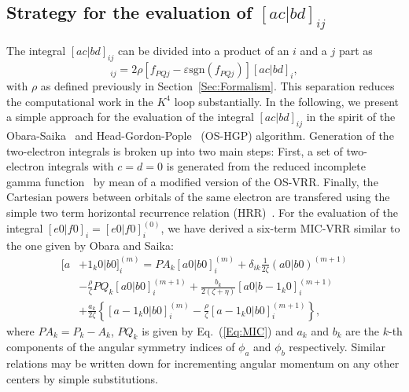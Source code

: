 \documentclass[prl,preprint,doublespace]{revtex4} %
\begin{document}
\subsection{Strategy for the evaluation of $[ac|bd]_{ij}$}
The integral $[ac|bd]_{ij}$ can be divided into a product of an $i$ and a $j$ part as
\begin{equation*}
 [ac|bd]_{ij}=2\rho[f_{PQj}-\varepsilon\mathrm{sgn}(f_{PQj}) ][ac|bd]_{i},
\end{equation*}
with $\rho$ as defined previously in Section~\ref{Sec:Formalism}. 
This separation reduces the computational work
in the $K^4$ loop substantially.
In the following, we present a simple approach for the evaluation of
the integral $[ac|bd]_{ij}$ in the spirit of the Obara-Saika~\cite{SObara86}
and Head-Gordon-Pople~\cite{MGordon88} (OS-HGP) algorithm.
Generation of the two-electron integrals is broken up into two
main steps: First, a set of two-electron integrals with $c=d=0$ is generated from the
reduced incomplete gamma function~\cite{IShavitt63} 
by mean of a modified version of the OS-VRR. Finally,
the Cartesian powers between orbitals of the same electron are transfered using 
the simple two term horizontal recurrence relation (HRR)~\cite{MGordon88}.
For the evaluation of the integral $[e0|f0]_{i}=[e0|f0]_{i}^{(0)}$, we have 
derived a six-term MIC-VRR similar
to the one given by Obara and Saika:
\begin{equation}\label{Eq:MIC-VRR}
  \begin{split}
    [a&+1_k0|b0]_{i}^{(m)}=
    PA_k[a0|b0]_{i}^{(m)}
    +\delta_{ik}\frac{1}{2\zeta}(a0|b0)^{(m+1)}\\
    &-\frac{\rho}{\zeta}PQ_k[a0|b0]_{i}^{(m+1)}
    +\frac{b_k}{2(\zeta+\eta)}[a0|b-1_k0]_{i}^{(m+1)}\\
    &+\frac{a_k}{2\zeta}
       \left\{
	 [a-1_k0|b0]_{i}^{(m)}-\frac{\rho}{\zeta}[a-1_k0|b0]_{i}^{(m+1)}
       \right\},
  \end{split}
\end{equation}
where $PA_k=P_k-A_k$, $PQ_k$ is given by Eq.~(\ref{Eq:MIC})
and $a_k$ and $b_k$ are the $k$-th components of the angular 
symmetry indices of $\phi_a$ and $\phi_b$ respectively. 
Similar relations may be written down for incrementing angular momentum 
on any other centers by simple substitutions.
\end{document}
